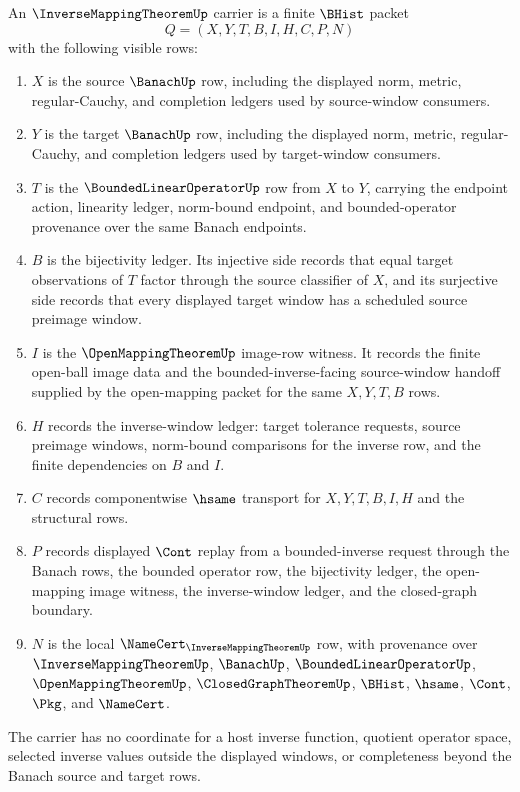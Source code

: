 \begin{definition}
\label{def:inverse-mapping-theorem-carrier}
An $\InverseMappingTheoremUp$ carrier is a finite $\BHist$ packet
$$
Q=(X,Y,T,B,I,H,C,P,N)
$$
with the following visible rows:
\begin{enumerate}
\item $X$ is the source $\BanachUp$ row, including the displayed norm, metric, regular-Cauchy, and completion ledgers used by source-window consumers.
\item $Y$ is the target $\BanachUp$ row, including the displayed norm, metric, regular-Cauchy, and completion ledgers used by target-window consumers.
\item $T$ is the $\BoundedLinearOperatorUp$ row from $X$ to $Y$, carrying the endpoint action, linearity ledger, norm-bound endpoint, and bounded-operator provenance over the same Banach endpoints.
\item $B$ is the bijectivity ledger. Its injective side records that equal target observations of $T$ factor through the source classifier of $X$, and its surjective side records that every displayed target window has a scheduled source preimage window.
\item $I$ is the $\OpenMappingTheoremUp$ image-row witness. It records the finite open-ball image data and the bounded-inverse-facing source-window handoff supplied by the open-mapping packet for the same $X,Y,T,B$ rows.
\item $H$ records the inverse-window ledger: target tolerance requests, source preimage windows, norm-bound comparisons for the inverse row, and the finite dependencies on $B$ and $I$.
\item $C$ records componentwise $\hsame$ transport for $X,Y,T,B,I,H$ and the structural rows.
\item $P$ records displayed $\Cont$ replay from a bounded-inverse request through the Banach rows, the bounded operator row, the bijectivity ledger, the open-mapping image witness, the inverse-window ledger, and the closed-graph boundary.
\item $N$ is the local $\NameCert_{\InverseMappingTheoremUp}$ row, with provenance over $\InverseMappingTheoremUp$, $\BanachUp$, $\BoundedLinearOperatorUp$, $\OpenMappingTheoremUp$, $\ClosedGraphTheoremUp$, $\BHist$, $\hsame$, $\Cont$, $\Pkg$, and $\NameCert$.
\end{enumerate}
The carrier has no coordinate for a host inverse function, quotient operator space, selected inverse values outside the displayed windows, or completeness beyond the Banach source and target rows.
\end{definition}


